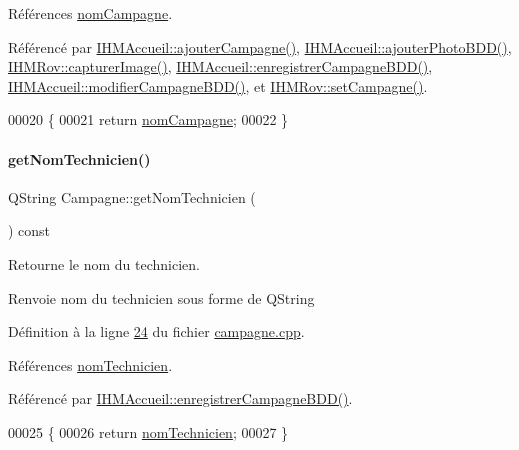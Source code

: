 Références \hyperlink{campagne_8h_source_l00038}{nom\+Campagne}.



Référencé par \hyperlink{ihmaccueil_8cpp_source_l00254}{I\+H\+M\+Accueil\+::ajouter\+Campagne()}, \hyperlink{ihmaccueil_8cpp_source_l00313}{I\+H\+M\+Accueil\+::ajouter\+Photo\+B\+D\+D()}, \hyperlink{ihmrov_8cpp_source_l00179}{I\+H\+M\+Rov\+::capturer\+Image()}, \hyperlink{ihmaccueil_8cpp_source_l00273}{I\+H\+M\+Accueil\+::enregistrer\+Campagne\+B\+D\+D()}, \hyperlink{ihmaccueil_8cpp_source_l00295}{I\+H\+M\+Accueil\+::modifier\+Campagne\+B\+D\+D()}, et \hyperlink{ihmrov_8cpp_source_l00143}{I\+H\+M\+Rov\+::set\+Campagne()}.


\begin{DoxyCode}
00020 \{
00021     \textcolor{keywordflow}{return} \hyperlink{class_campagne_a4455078418041442fa3998b9b6cb6230}{nomCampagne};
00022 \}
\end{DoxyCode}
\mbox{\label{class_campagne_ae1df1bd6234222ccdaf5a1d20d64ee46}} 
\paragraph{\texorpdfstring{get\+Nom\+Technicien()}{getNomTechnicien()}}
{\footnotesize\ttfamily Q\+String Campagne\+::get\+Nom\+Technicien (\begin{DoxyParamCaption}{ }\end{DoxyParamCaption}) const}



Retourne le nom du technicien. 

\begin{DoxyReturn}{Renvoie}
nom du technicien sous forme de Q\+String 
\end{DoxyReturn}


Définition à la ligne \hyperlink{campagne_8cpp_source_l00024}{24} du fichier \hyperlink{campagne_8cpp_source}{campagne.\+cpp}.



Références \hyperlink{campagne_8h_source_l00039}{nom\+Technicien}.



Référencé par \hyperlink{ihmaccueil_8cpp_source_l00273}{I\+H\+M\+Accueil\+::enregistrer\+Campagne\+B\+D\+D()}.


\begin{DoxyCode}
00025 \{
00026     \textcolor{keywordflow}{return} \hyperlink{class_campagne_a6d3e88fb93b38cbcf1bc53cc9fc30f2f}{nomTechnicien};
00027 \}
\end{DoxyCode}
\mbox{\label{class_campagne_ac6c7772ef5d7b15964664d659b486263}} 
